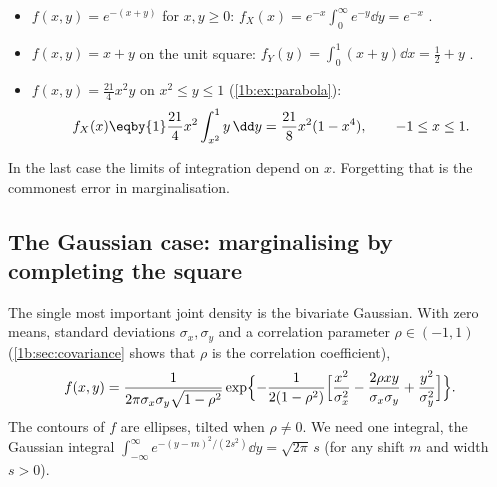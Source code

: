 \label{1b:ex:marginal-integrals}
\begin{itemize}[leftmargin=1.2em,itemsep=1pt]
  \item $f(x,y)=e^{-(x+y)}$ for $x,y\ge0$:
        $f_X(x)=e^{-x}\int_0^\infty e^{-y}\dd y=e^{-x}$ .
  \item $f(x,y)=x+y$ on the unit square:
        $f_Y(y)=\int_0^1(x+y)\dd x=\tfrac12+y$ .
  \item $f(x,y)=\tfrac{21}{4}x^2y$ on $x^2\le y\le1$ (\cref{1b:ex:parabola}):
        \begin{align*}
          f_X(x)
          \eqby{1} \frac{21}{4}x^2\int_{x^2}^{1}y\,\dd y
          = \frac{21}{8}x^2(1-x^4),\qquad -1\le x\le1 .
        \end{align*}
\end{itemize}
In the last case the limits of integration depend on $x$. Forgetting that is
the commonest error in marginalisation.

\subsection{The Gaussian case: marginalising by completing the square}

The single most important joint density is the bivariate Gaussian. With zero
means, standard deviations $\sigma_x,\sigma_y$ and a correlation parameter
$\rho\in(-1,1)$ (\cref{1b:sec:covariance} shows that $\rho$ is the
correlation coefficient),
\begin{equation}
  f(x,y)=\frac{1}{2\pi\sigma_x\sigma_y\sqrt{1-\rho^2}}
  \exp\Bigl\{-\frac{1}{2(1-\rho^2)}
  \Bigl[\frac{x^2}{\sigma_x^2}-\frac{2\rho xy}{\sigma_x\sigma_y}
  +\frac{y^2}{\sigma_y^2}\Bigr]\Bigr\}.
  \label{1b:eq:bvn}
\end{equation}
The contours of $f$ are ellipses, tilted when $\rho\ne0$. We need one integral,
the Gaussian integral
$\int_{-\infty}^{\infty}e^{-(y-m)^2/(2s^2)}\dd y=\sqrt{2\pi}\,s$
(for any shift $m$ and width $s>0$).

